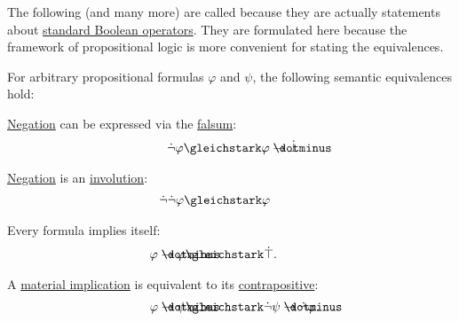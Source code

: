 \begin{proposition}\label{thm:boolean_equivalences}
  The following (and many more) are called  because they are actually statements about \hyperref[def:standard_boolean_operators]{standard Boolean operators}. They are formulated here because the framework of propositional logic is more convenient for stating the equivalences.

  For arbitrary propositional formulas \( \varphi \) and \( \psi \), the following semantic equivalences hold:
  \begin{thmenum}
     \hyperref[def:propositional_language/negation]{Negation} can be expressed via the \hyperref[def:propositional_language/constants/falsum]{falsum}:
    \begin{equation}\label{eq:thm:boolean_equivalences/negation_bottom}
      \begin{split}
        \mathllap{\synneg \varphi} &\gleichstark \mathrlap{\varphi \synimplies \synbot}.
      \end{split}
    \end{equation}

     \hyperref[def:propositional_language/negation]{Negation} is an \hyperref[def:involution]{involution}:
    \begin{equation}\label{eq:thm:boolean_equivalences/double_negation}
      \begin{split}
        \mathllap{\synneg \synneg \varphi} &\gleichstark \mathrlap{\varphi}.
      \end{split}
    \end{equation}

     Every formula implies itself:
    \begin{equation}\label{eq:thm:boolean_equivalences/self_conditional}
      \begin{split}
        \mathllap{\varphi \synimplies \varphi} &\gleichstark \mathrlap{\syntop.}
      \end{split}
    \end{equation}

     A \hyperref[def:material_implication]{material implication} is equivalent to its \hyperref[def:material_implication/contrapositive]{contrapositive}:
    \begin{equation}\label{eq:thm:boolean_equivalences/contrapositive}
      \begin{split}
        \mathllap{\varphi \synimplies \psi} &\gleichstark \mathrlap{\synneg \psi \synimplies \synneg \varphi.}
      \end{split}
    \end{equation}


\end{thmenum}
\end{proposition}
